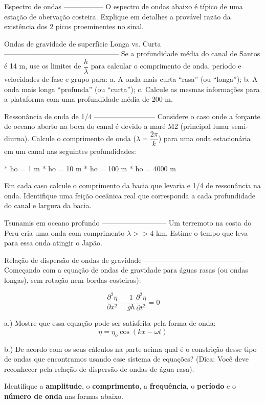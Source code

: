 Espectro de ondas
-----------------
O espectro de ondas abaixo é típico de uma estação de obervação costeira.
Explique em detalhes a provável razão da existência dos 2 picos proeminentes no
sinal.

Ondas de gravidade de superfície Longa vs. Curta
------------------------------------------------
Se a profundidade média do canal de Santos é 14 m, use os limites de
$\dfrac{h}{\lambda}$ para calcular o comprimento de onda, período e velocidades
de fase e grupo para:
a. A onda mais curta ``rasa'' (ou ``longa'');
b. A onda mais longa ``profunda'' (ou ``curta'');
c. Calcule as mesmas informações para a plataforma com uma profundidade média de
200 m.

Ressonância de onda de 1/4
--------------------------
Considere o caso onde a forçante de oceano aberto na boca do canal é devido a
maré M2 (principal lunar semi-diurna).  Calcule o comprimento de onda
($\lambda = \dfrac{2\pi}{k}$) para uma onda estacionária em um canal nas
seguintes profundidades:

* ho = 1 m
* ho = 10 m
* ho = 100 m
* ho = 4000 m

Em cada caso calcule o comprimento da bacia que levaria e 1/4 de ressonância na
onda.  Identifique uma feição oceânica real que corresponda a cada profundidade
do canal e largura da bacia.

Tsunamis em oceano profundo
---------------------------
Um terremoto na costa do Peru cria uma onda com comprimento $\lambda >> 4$ km.
Estime o tempo que leva para essa onda atingir o Japão.


Relação de dispersão de ondas de gravidade
------------------------------------------
Começando com a equação de ondas de gravidade para águas rasas (ou ondas longas),
sem rotação nem bordas costeiras):

\[
  \dfrac{\partial^2 \eta}{\partial x^2}  - \dfrac{1}{gh}\dfrac{\partial^2 \eta}{\partial t^2} = 0
\]

a.) Mostre que essa equação pode ser satisfeita pela forma de onda:
\[
  \eta = \eta_o \cos(kx - \omega t)
\]

b.) De acordo com os seus cálculos na parte acima qual é o constrição desse tipo
de ondas que encontramos usando esse sistema de equações?
(Dica:  Você deve reconhecer pela relação de dispersão de ondas de água rasa).


\question
Identifique a {\bf amplitude}, o {\bf comprimento}, a {\bf frequência},
o {\bf período} e o {\bf número de onda} nas formas abaixo.

